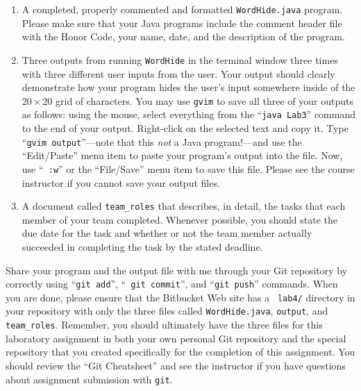 \begin{enumerate}

        \item A completed, properly commented and formatted {\tt WordHide.java} program. Please make sure that your Java
          programs include the comment header file with the Honor Code, your name, date, and the description of the
          program.

        \item Three outputs from running {\tt WordHide} in the terminal window three times with three different user
          inputs from the user. Your output should clearly demonstrate how your program hides the user's input somewhere
          inside of the $20 \times 20$ grid of characters.  You may use {\tt gvim} to save all three of your outputs as
          follows: using the mouse, select everything from the ``{\tt java Lab3}'' command to the end of your output.
          Right-click on the selected text and copy it.  Type ``{\tt gvim output}''---note that this {\em not} a Java
          program!---and use the ``Edit/Paste'' menu item to paste your program's output into the file.  Now, use ``{\tt
          :w}'' or the ``File/Save'' menu item to save this file. Please see the course instructor if you cannot save
          your output files.

        \item A document called {\tt team\_roles} that describes, in detail, the tasks that each member of your
          team completed. Whenever possible, you should state the due date for the task and whether or not the team
          member actually succeeded in completing the task by the stated deadline.

\end{enumerate}

\vspace{-0.1in}

Share your program and the output file with me through your Git repository by correctly using ``{\tt git add}'', ``{\tt
git commit}'', and ``{\tt git push}'' commands. When you are done, please ensure that the Bitbucket Web site has a {\tt
lab4/} directory in your repository with only the three files called {\tt WordHide.java}, {\tt output}, and {\tt
team\_roles}. Remember, you should ultimately have the three files for this laboratory assignment in both your own
personal Git repository and the special repository that you created specifically for the completion of this assignment.
You should review the ``Git Cheatsheet'' and see the instructor if you have questions about assignment submission with
{\tt git}.


